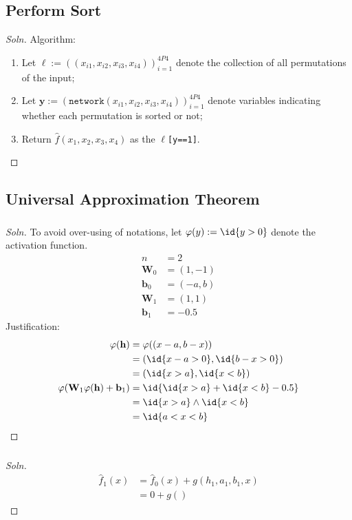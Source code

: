 \documentclass{article}
\begin{document}
	\subsection{Perform Sort}
	\begin{proof}[Soln]
		Algorithm:
		\begin{enumerate}
			\item Let $\ell := ((x_{i1}, x_{i2}, x_{i3}, x_{i4}))_{i=1}^{4P4}$ denote the collection of all permutations of the input;
			\item Let $\textbf{y} := (\texttt{network}(x_{i1}, x_{i2}, x_{i3}, x_{i4}))_{i=1}^{4P4}$ denote variables indicating whether each permutation is sorted or not;
			\item Return $\hat{f}(x_1, x_2, x_3, x_4)$ as the $\ell$\texttt{[y==1]}.
		\end{enumerate}
	\end{proof}
	
	\subsection{Universal Approximation Theorem}
	\subsubsection{}
	\begin{proof}[Soln]
		To avoid over-using of notations, let $\varphi(y) := \id{y > 0}$ denote the activation function.
		\begin{align}
			n &= 2 \\
			\textbf{W}_0 &= (1, -1) \\
			\textbf{b}_0 &= (-a, b) \\
			\textbf{W}_1 &= (1, 1) \\
			\textbf{b}_1 &= - 0.5
		\end{align}
		Justification:
		\begin{align}
			\varphi(\textbf{h}) &= \varphi((x - a, b - x)) \\
			&= (\id{x-a>0}, \id{b-x>0}) \\
			&= (\id{x>a}, \id{x<b}) \\
			\varphi(\textbf{W}_1 \varphi(\textbf{h}) + \textbf{b}_1) &= \id{\id{x>a} + \id{x<b} - 0.5} \\
			&=\id{x>a} \land \id{x<b} \\
			&=\id{a < x < b}
		\end{align}
	\end{proof}
	\subsubsection{}
	\begin{proof}[Soln]
		\begin{align}
			\hat{f}_1(x) &= \hat{f}_0(x) + g(h_1, a_1, b_1, x) \\
			&= 0 + g\left( \right)
		\end{align}
	\end{proof}
\end{document}
